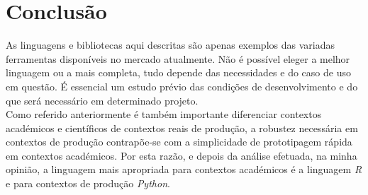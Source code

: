\section*{Conclusão}\label{sec:Conclusao}

As linguagens e bibliotecas aqui descritas são apenas exemplos das variadas ferramentas disponíveis no mercado atualmente. Não é possível eleger a melhor linguagem ou a mais completa, tudo depende das necessidades e do caso de uso em questão. É essencial um estudo prévio das condições de desenvolvimento e do que será necessário em determinado projeto.
\\Como referido anteriormente é também importante diferenciar contextos académicos e científicos de contextos reais de produção, a robustez necessária em contextos de produção contrapõe-se com a simplicidade de prototipagem rápida em contextos académicos. Por esta razão, e depois da análise efetuada, na minha opinião, a linguagem mais apropriada para contextos académicos é a linguagem \textit{R} e para contextos de produção \textit{Python}.